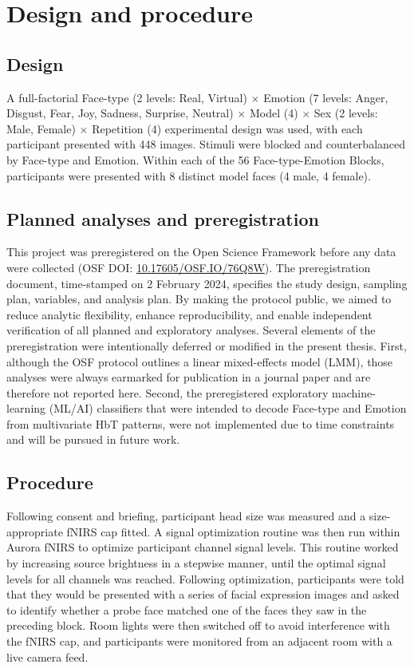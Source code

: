 \section{Design and procedure}
\subsection{Design}
\label{sec:Design}
A full-factorial Face-type (2 levels: Real, Virtual) \texorpdfstring{$\times$}{x} Emotion (7 levels: Anger, Disgust, Fear, Joy, Sadness, Surprise, Neutral) \texorpdfstring{$\times$}{x} Model (4) \texorpdfstring{$\times$}{x} Sex (2 levels: Male, Female) \texorpdfstring{$\times$}{x} Repetition (4) experimental design was used, with each participant presented with 448 images. 
Stimuli were blocked and counterbalanced by Face-type and Emotion. 
Within each of the 56 Face-type-Emotion Blocks, participants were presented with 8 distinct model faces (4 male, 4 female).

\subsection{Planned analyses and preregistration}
This project was preregistered on the Open Science Framework before any data were collected (OSF DOI: \href{https://doi.org/10.17605/OSF.IO/76Q8W}{10.17605/OSF.IO/76Q8W}).
The preregistration document, time-stamped on 2 February 2024, specifies the study design, sampling plan, variables, and analysis plan.
By making the protocol public, we aimed to reduce analytic flexibility, enhance reproducibility, and enable independent verification of all planned and exploratory analyses.
Several elements of the preregistration were intentionally deferred or modified in the present thesis. 
First, although the OSF protocol outlines a linear mixed-effects model (LMM), those analyses were always earmarked for publication in a journal paper and are therefore not reported here. 
Second, the preregistered exploratory machine-learning (ML/AI) classifiers that were intended to decode Face-type and Emotion from multivariate HbT patterns, were not implemented due to time constraints and will be pursued in future work.  

\subsection{Procedure}
\label{sec:Procedure}
Following consent and briefing, participant head size was measured and a size-appropriate fNIRS cap fitted. 
A signal optimization routine was then run within Aurora fNIRS to optimize participant channel signal levels. 
This routine worked by increasing source brightness in a stepwise manner, until the optimal signal levels for all channels was reached. 
Following optimization, participants were told that they would be presented with a series of facial expression images and asked to identify whether a probe face matched one of the faces they saw in the preceding block. 
Room lights were then switched off to avoid interference with the fNIRS cap, and participants were monitored from an adjacent room with a live camera feed. 

